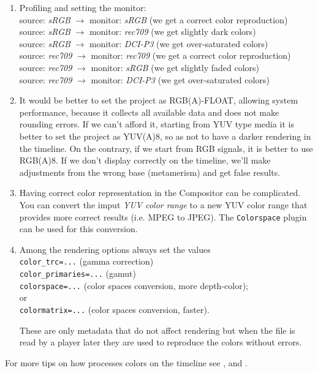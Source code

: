 \begin{enumerate}
	\item Profiling and setting the monitor: \\
	source: \textit{sRGB} $\rightarrow$ monitor: \textit{sRGB}  (we get a correct color reproduction) \\
	source: \textit{sRGB} $\rightarrow$ monitor: \textit{rec709} (we get slightly dark colors) \\
	source: \textit{sRGB} $\rightarrow$ monitor: \textit{DCI-P3} (we get over-saturated colors) \\
	
	source: \textit{rec709} $\rightarrow$ monitor: \textit{rec709} (we get a correct color reproduction) \\
	source: \textit{rec709} $\rightarrow$ monitor: \textit{sRGB} (we get slightly faded colors) \\
	source: \textit{rec709} $\rightarrow$ monitor: \textit{DCI-P3} (we get over-saturated colors)
	\item It would be better to set the project as RGB(A)-FLOAT, allowing system performance, because it collects all available data and does not make rounding errors. If we can't afford it, starting from YUV type media it is better to set the project as YUV(A)8, so as not to have a darker rendering in the timeline. On the contrary, if we start from RGB signals, it is better to use RGB(A)8. If we don't display correctly on the timeline, we'll make adjustments from the wrong base (metamerism) and get false results.
	\item Having correct color representation in the Compositor can be complicated. You can convert the imput \textit{YUV color range} to a new YUV color range that provides more correct results (i.e. MPEG to JPEG). The \texttt{Colorspace} plugin can be used for this conversion.
	\item Among the rendering options always set the values \\	
	\texttt{color\_trc=...} (gamma correction) \\
	\texttt{color\_primaries=...} (gamut) \\
	\texttt{colorspace=...} (color spaces conversion, more depth-color); \\
	or \\
	\texttt{colormatrix=...} (color spaces conversion, faster).
	
	These are only metadata that do not affect rendering but when the file is read by a player later they are used to reproduce the colors without errors.
\end{enumerate}

For more tips on how \CGG{} processes colors on the timeline see  ,  and .


